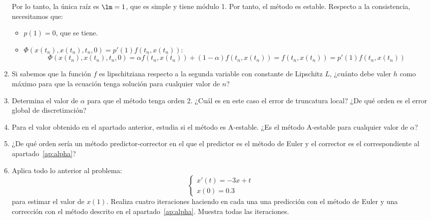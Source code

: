 \begin{ejercicio}
\begin{enumerate}
        Por lo tanto, la única raíz es $\lm = 1$, que es simple y tiene módulo 1. Por tanto, el método es estable.
        Respecto a la consistencia, necesitamos que:
        \begin{itemize}
            \item $p(1) = 0$, que se tiene.
            \item $\Phi(x(t_n), x(t_n), t_n, 0) = p'(1)f(t_n, x(t_n))$:
            \begin{equation*}
                \Phi(x(t_n), x(t_n), t_n, 0) = \alpha f(t_n, x(t_n)) + (1 - \alpha) f(t_n, x(t_n))
                = f(t_n, x(t_n)) = p'(1)f(t_n, x(t_n))
            \end{equation*}
        \end{itemize}
        \item Si sabemos que la función $f$ es lipschitziana respecto a la segunda variable con constante de Lipschitz $L$, ¿cuánto debe valer $h$ como máximo para que la ecuación tenga solución para cualquier valor de $n$?
        \item\label{ap:alpha}
        Determina el valor de $\alpha$ para que el método tenga orden 2. ¿Cuál es en este caso el error de truncatura local? ¿De qué orden es el error global de discretización?
        \item Para el valor obtenido en el apartado anterior, estudia si el método es A-estable. ¿Es el método A-estable para cualquier valor de $\alpha$?
        \item ¿De qué orden sería un método predictor-corrector en el que el predictor es el método de Euler y el corrector es el correspondiente al apartado~\ref{ap:alpha}?
        \item Aplica todo lo anterior al problema:
            \begin{equation*}
                \begin{cases}
                    x'(t) = -3x + t \\
                    x(0) = 0.3
                \end{cases}
            \end{equation*}
            para estimar el valor de $x(1)$. Realiza cuatro iteraciones haciendo en cada una una predicción con el método de Euler y una corrección con el método descrito en el apartado~\ref{ap:alpha}. Muestra todas las iteraciones.
    \end{enumerate}
\end{ejercicio}

